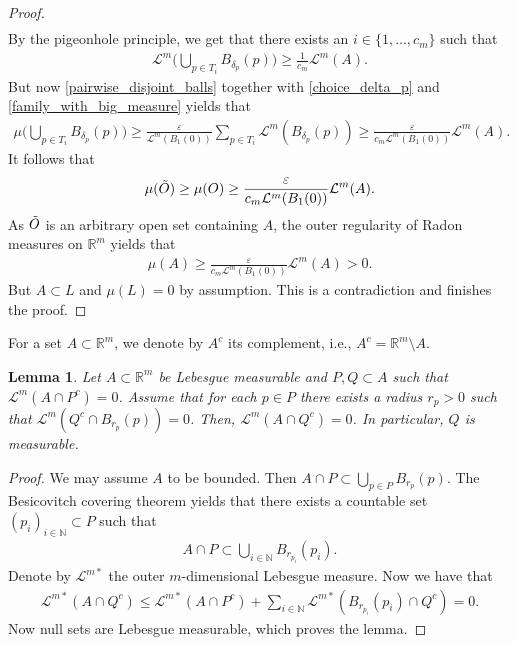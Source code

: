 \documentclass[a4paper,10pt]{article}
\newtheorem{lemma}[theorem]{Lemma}
\numberwithin{equation}{section}
\newcommand{\R}{\mathbb{R}}
\newcommand{\N}{\mathbb{N}}
\newcommand{\e}{\varepsilon}
\begin{document}
\begin{proof}
\begin{align}
    \end{align}
    By the pigeonhole principle, we get that there exists an $i \in \{1, \ldots, c_m\}$ such that 
    \begin{align}\label{family_with_big_measure}
        \mathcal{L}^m\Big( \bigcup_{p\in T_i} B_{\delta_{p}}(p) \Big) \geq \frac{1}{c_m} \mathcal{L}^m(A). 
    \end{align}
    But now \eqref{pairwise_disjoint_balls} together with \eqref{choice_delta_p} and \eqref{family_with_big_measure} yields that 
    \begin{align}
        \mu\Big( \bigcup_{p\in T_i} B_{\delta_{p}}(p) \Big) \geq  \frac{\e}{\mathcal{L}^m(B_1(0))} \sum_{p \in T_i} \mathcal{L}^m( B_{\delta_{p}}(p)) \geq \frac{\e}{c_m\mathcal{L}^m(B_1(0))} \mathcal{L}^m(A). 
    \end{align}
    It follows that 
    \begin{align*}
        \mu(\Tilde{O}) \geq \mu(O) \geq \frac{\e}{c_m\mathcal{L}^m(B_1(0))} \mathcal{L}^m(A).
    \end{align*}
    As $\Tilde{O}$ is an arbitrary open set containing $A$, the outer regularity of Radon measures on $\R^m$ yields that 
    \begin{align}
        \mu(A) \geq \frac{\e}{c_m\mathcal{L}^m(B_1(0))} \mathcal{L}^m(A) >0.
    \end{align}
    But $A \subset L$ and $\mu(L)=0$ by assumption. This is a contradiction and finishes the proof. 
\end{proof}
For a set $A \subset \R^m$, we denote by $A^c$ its complement, i.e., $A^c = \R^m \setminus A$.
\smallskip

\begin{lemma}\label{null_set_local_to_global}
    Let $A \subset \R^m$ be Lebesgue measurable and $P, Q \subset A$ such that $\mathcal{L}^m(A \cap P^c) = 0$. Assume that for each $p \in P$ there exists a radius $r_p>0$ such that $\mathcal{L}^m(Q^c \cap B_{r_p}(p))=0$. Then, $\mathcal{L}^m(A \cap Q^c)=0$. In particular, $Q$ is measurable.  
\end{lemma}
\begin{proof}
    We may assume $A$ to be bounded.
    Then $A \cap P \subset \bigcup_{p \in P}B_{r_p}(p)$. The Besicovitch covering theorem yields that there exists a countable set $(p_i)_{i \in \N} \subset P$ such that 
    \begin{align*}
        A \cap P \subset \bigcup_{i \in \N}B_{r_{p_i}}(p_i).
    \end{align*}
    Denote by $\mathcal{L}^{m*}$ the outer $m$-dimensional Lebesgue measure. 
    Now we have that 
    \begin{align*}
        \mathcal{L}^{m*}(A \cap Q^c) \leq \mathcal{L}^{m*}(A \cap P^c) + \sum_{i \in \N} \mathcal{L}^{m*}(B_{r_{p_i}}(p_i)\cap Q^c) =0.
    \end{align*}
    Now null sets are Lebesgue measurable, which proves the lemma. 
\end{proof}
\end{document}

